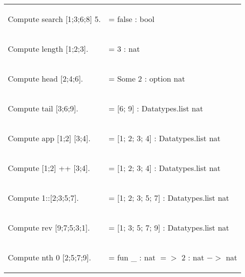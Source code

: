 \hspace{-1cm}
\begin{tabular}{p{8cm} p{8cm}}
\begin{code}	Compute search [1;3;6;8] 5.		\end{code}	
&
\begin{msg}	= false     : bool					\end{msg}
\\	
\begin{code}	Compute length [1;2;3].			\end{code}
&
\begin{msg}	= 3     : nat					\end{msg}
\\
\begin{code}	Compute head [2;4;6].			\end{code}
&
\begin{msg}	= Some 2     : option nat			\end{msg}
\\
\begin{code}	Compute tail [3;6;9].				\end{code}
&
\begin{msg}	= [6; 9]     : Datatypes.list nat		\end{msg}
\\
\begin{code}	Compute app [1;2] [3;4].			\end{code}
&
\begin{msg}	= [1; 2; 3; 4]     : Datatypes.list nat	\end{msg}
\\
\begin{code}	Compute [1;2] ++ [3;4].			\end{code}
&
\begin{msg}	= [1; 2; 3; 4]     : Datatypes.list nat	\end{msg}
\\
\begin{code}	Compute 1::[2;3;5;7].				\end{code}
&
\begin{msg}	= [1; 2; 3; 5; 7]     : Datatypes.list nat	\end{msg}
\\
\begin{code}	Compute rev [9;7;5;3;1].			\end{code}
&
\begin{msg}	= [1; 3; 5; 7; 9]     : Datatypes.list nat	\end{msg}
\\
\begin{code}	Compute nth 0 [2;5;7;9].			\end{code}	
&
\begin{msg}	= fun \_ : nat $=>$ 2     : nat $->$ nat	\end{msg}
\end{tabular}

